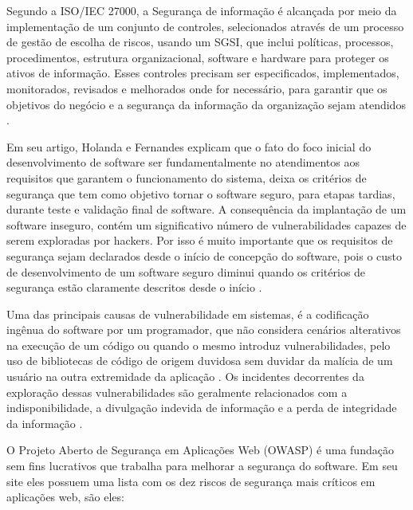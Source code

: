 Segundo a ISO/IEC 27000, a Segurança de informação é alcançada por meio da implementação de um conjunto de controles, selecionados através de um processo de gestão de escolha de riscos, usando um SGSI, que inclui políticas, processos, procedimentos, estrutura organizacional, software e hardware para proteger os ativos de informação. Esses controles precisam ser especificados, implementados, monitorados, revisados e melhorados onde for necessário, para garantir que  os objetivos do negócio e a segurança da informação da organização sejam atendidos \cite{ISO27000}.



Em seu artigo, Holanda e Fernandes \cite{holanda2009segurancca} explicam que o fato do foco inicial do desenvolvimento de software ser fundamentalmente no atendimentos aos requisitos que garantem o funcionamento do sistema, deixa os critérios de segurança que tem como objetivo tornar o software seguro, para etapas tardias, durante teste e validação final de software. A consequência da implantação de um software inseguro, contém um significativo número de vulnerabilidades capazes de serem exploradas por hackers. Por isso é muito importante que os requisitos de segurança sejam declarados desde o início de concepção do software, pois o custo de desenvolvimento de um software seguro diminui quando os critérios de segurança estão claramente descritos desde o início \cite{holanda2009segurancca}.

Uma das principais causas de vulnerabilidade em sistemas, é a codificação ingênua do software por um programador, que não considera cenários alterativos na execução de um código ou quando o mesmo introduz vulnerabilidades, pelo uso de bibliotecas de código de origem duvidosa sem duvidar da malícia de um usuário na outra extremidade da aplicação \cite{holanda2009segurancca}. Os incidentes decorrentes da exploração dessas vulnerabilidades são geralmente relacionados com a indisponibilidade, a divulgação indevida de informação e a perda de integridade da informação \cite{holanda2009segurancca}.

O Projeto Aberto de Segurança em Aplicações Web (OWASP) é uma fundação sem fins lucrativos que trabalha para melhorar a segurança do software. Em seu site eles possuem uma lista \cite{owasp} com os dez riscos de segurança mais críticos em aplicações web, são eles:

